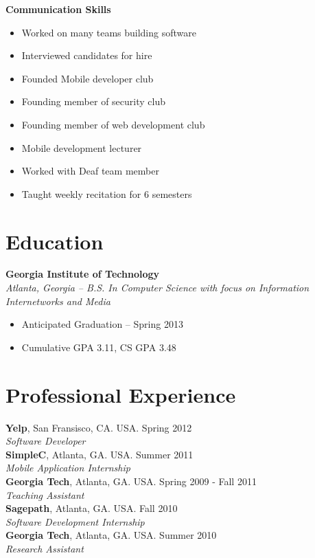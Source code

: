 \documentclass[margin,line]{res}
\begin{document}
\begin{resume}
 {\bf Communication Skills}
    \begin{itemize}
    \item Worked on many teams building software
    \item Interviewed candidates for hire
    \item Founded Mobile developer club
    \item Founding member of security club
    \item Founding member of web development club
    \item Mobile development lecturer
    \item Worked with Deaf team member
    \item Taught weekly recitation for 6 semesters
    \end{itemize}

\section{\sc Education}
    {\bf Georgia Institute of Technology}\\
    {\em Atlanta, Georgia -- B.S. In Computer Science with focus on
      Information Internetworks and Media}
    \begin{itemize}
    \item Anticipated Graduation -- Spring 2013
    \item Cumulative GPA 3.11, CS GPA 3.48
    \end{itemize}

\section{\sc Professional Experience}
    {\bf Yelp}, San Fransisco, CA. USA. \hfill{Spring 2012}\\
    {\em Software Developer}\hfill\\

    {\bf SimpleC}, Atlanta, GA. USA. \hfill{Summer 2011}\\
    {\em Mobile Application Internship} \\

    {\bf Georgia Tech}, Atlanta, GA. USA. \hfill{Spring 2009 - Fall 2011}\\
    {\em Teaching Assistant} \\

    {\bf Sagepath}, Atlanta, GA. USA. \hfill{Fall 2010}\\
    {\em Software Development Internship} \\

    {\bf Georgia Tech}, Atlanta, GA. USA. \hfill{Summer 2010}\\
    {\em Research Assistant} \\

\end{resume}
\end{document}
